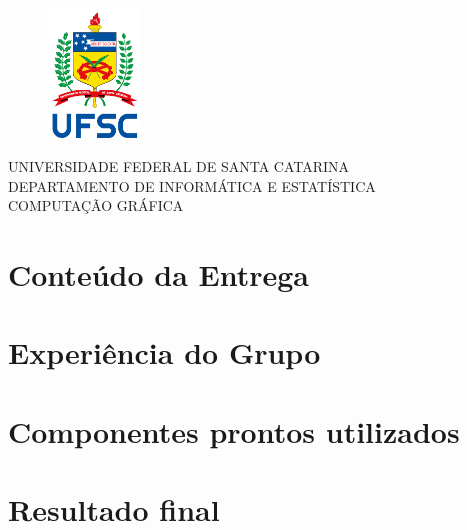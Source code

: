 \documentclass[
	12pt,				%
	openright,			%
	oneside,			%
	a4paper,			%
	english,			%
	brazil,				%
	]{abntex2}
\renewcommand{\imprimircapa}{%
    \begin{capa}%
        \begin{figure}
            \center
            \includegraphics[width=2.5cm]{imagens/logo_ufsc.png}
        \end{figure}
        \center
        \ABNTEXchapterfont\large{UNIVERSIDADE FEDERAL DE SANTA CATARINA\\ DEPARTAMENTO DE INFORMÁTICA E ESTATÍSTICA \\ COMPUTAÇÃO GRÁFICA}
        \vfill
        \begin{center}
        \ABNTEXchapterfont\bfseries\LARGE\imprimirtitulo
        \end{center}
        \vfill
        {\ABNTEXchapterfont\large\imprimirautor}
        \vfill
        \large\imprimirlocal
        \large\imprimirdata
        \vspace*{1cm}
        \end{capa}
}
\begin{document}
\imprimircapa

\ABNTEXsectionfont
\tableofcontents
\chapter{Conteúdo da Entrega}
    
\chapter{Experiência do Grupo}
\textual
    
\chapter{Componentes prontos utilizados}
\textual
    

\chapter{Resultado final}
\textual
    


% 
\end{document}
